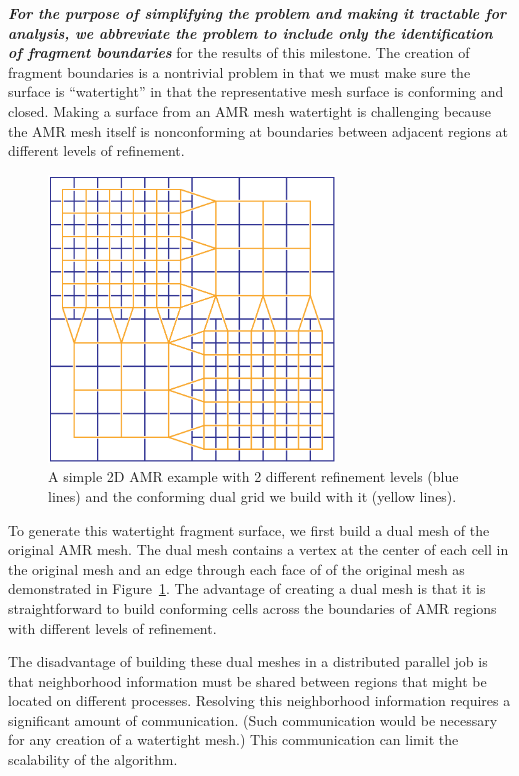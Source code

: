 \textbf{\emph{For the purpose of simplifying the problem and making it tractable
  for analysis, we abbreviate the problem to include only the
  identification of fragment boundaries}} for the results of this milestone.
The creation of fragment boundaries is a nontrivial problem in that we must
make sure the surface is ``watertight'' in that the representative mesh
surface is conforming and closed.  Making a surface from an AMR mesh
watertight is challenging because the AMR mesh itself is nonconforming at
boundaries between adjacent regions at different levels of refinement.

\begin{figure}[htb]
  \centering
  \includegraphics[width=3in]{figures/AMRDual}
  \caption[A simple 2D AMR example.]{A simple 2D AMR example with 2
    different refinement levels (blue lines) and the conforming dual grid
    we build with it (yellow lines).}
  \label{fig:AMRDual}
\end{figure}

To generate this watertight fragment surface, we first build a dual mesh of
the original AMR mesh.  The dual mesh contains a vertex at the center of
each cell in the original mesh and an edge through each face of of the
original mesh as demonstrated in Figure~\ref{fig:AMRDual}.  The advantage
of creating a dual mesh is that it is straightforward to build conforming
cells across the boundaries of AMR regions with different levels of
refinement.

The disadvantage of building these dual meshes in a distributed parallel
job is that neighborhood information must be shared between regions that
might be located on different processes.  Resolving this neighborhood
information requires a significant amount of communication.  (Such
communication would be necessary for any creation of a watertight mesh.)
This communication can limit the scalability of the algorithm.


